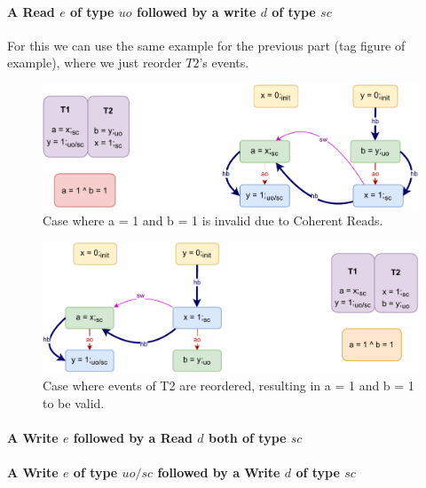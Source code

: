     \paragraph{A Read $e$ of type $uo$ followed by a write $d$ of type $sc$}

        For this we can use the same example for the previous part (tag figure of example), where we just reorder $T2$'s events.
        \begin{figure}[H]
            \centering
            \includegraphics[scale=0.7]{InstructionReordering/Example4(Ruo-Wsc).pdf}
            \caption{Case where a = 1 and b = 1 is invalid due to Coherent Reads.}
        \end{figure}

        \begin{figure}[H]
            \centering
            \includegraphics[scale=0.7]{InstructionReordering/Example4R(Ruo-Wsc).pdf}
            \caption{Case where events of T2 are reordered, resulting in  a = 1 and b = 1 to be valid.}
        \end{figure}

    \paragraph{A Write $e$ followed by a Read $d$ both of type $sc$}

    \paragraph{A Write $e$ of type $uo/sc$ followed by a Write $d$ of type $sc$}